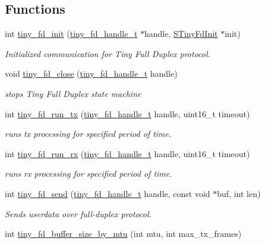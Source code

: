 \subsection*{Functions}
\begin{DoxyCompactItemize}
\item 
int \hyperlink{group__FULL__DUPLEX__API_ga73c3e76cfbcd7b9bb8e1f7826175774b}{tiny\+\_\+fd\+\_\+init} (\hyperlink{group__FULL__DUPLEX__API_ga91e6b79431fe38570fb102701ef0b7e8}{tiny\+\_\+fd\+\_\+handle\+\_\+t} $\ast$handle, \hyperlink{group__FULL__DUPLEX__API_gac931714d7bbe299856f4533fd1edb7f6}{S\+Tiny\+Fd\+Init} $\ast$init)
\begin{DoxyCompactList}\small\item\em Initialized communication for Tiny Full Duplex protocol. \end{DoxyCompactList}\item 
void \hyperlink{group__FULL__DUPLEX__API_ga11e470503e3359bc29a5bcb65a9771d5}{tiny\+\_\+fd\+\_\+close} (\hyperlink{group__FULL__DUPLEX__API_ga91e6b79431fe38570fb102701ef0b7e8}{tiny\+\_\+fd\+\_\+handle\+\_\+t} handle)
\begin{DoxyCompactList}\small\item\em stops Tiny Full Duplex state machine \end{DoxyCompactList}\item 
int \hyperlink{group__FULL__DUPLEX__API_ga601c9874a570331580856c1ea28f7914}{tiny\+\_\+fd\+\_\+run\+\_\+tx} (\hyperlink{group__FULL__DUPLEX__API_ga91e6b79431fe38570fb102701ef0b7e8}{tiny\+\_\+fd\+\_\+handle\+\_\+t} handle, uint16\+\_\+t timeout)
\begin{DoxyCompactList}\small\item\em runs tx processing for specified period of time. \end{DoxyCompactList}\item 
int \hyperlink{group__FULL__DUPLEX__API_gad31f944514aef01e27bc3ec67fdbe140}{tiny\+\_\+fd\+\_\+run\+\_\+rx} (\hyperlink{group__FULL__DUPLEX__API_ga91e6b79431fe38570fb102701ef0b7e8}{tiny\+\_\+fd\+\_\+handle\+\_\+t} handle, uint16\+\_\+t timeout)
\begin{DoxyCompactList}\small\item\em runs rx processing for specified period of time. \end{DoxyCompactList}\item 
int \hyperlink{group__FULL__DUPLEX__API_ga490157ee98ea6148f99a5bb1f26c5f60}{tiny\+\_\+fd\+\_\+send} (\hyperlink{group__FULL__DUPLEX__API_ga91e6b79431fe38570fb102701ef0b7e8}{tiny\+\_\+fd\+\_\+handle\+\_\+t} handle, const void $\ast$buf, int len)
\begin{DoxyCompactList}\small\item\em Sends userdata over full-\/duplex protocol. \end{DoxyCompactList}\item 
int \hyperlink{group__FULL__DUPLEX__API_ga19789bea5b5acd68804773f0d6b0e3f7}{tiny\+\_\+fd\+\_\+buffer\+\_\+size\+\_\+by\+\_\+mtu} (int mtu, int max\+\_\+tx\+\_\+frames)
\end{DoxyCompactItemize}



